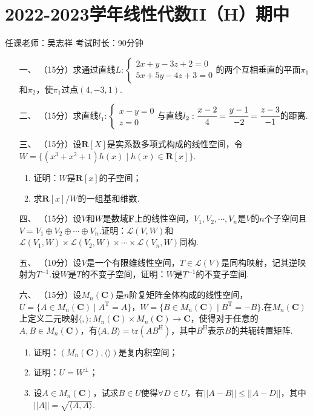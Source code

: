 \section*{2022-2023学年线性代数II（H）期中}

\begin{center}
    任课老师：吴志祥\hspace{4em} 考试时长：90分钟
\end{center}

\begin{enumerate}
	\item[一、]（15分）求通过直线$L:\begin{cases}
        2x+y-3z+2=0 \\ 5x+5y-4z+3=0
    \end{cases}$的两个互相垂直的平面$\pi_1$和$\pi_2$，使$\pi_1$过点$(4,-3,1)$.
	\item[二、]（15分）求直线$l_1:\begin{cases}
        x-y=0 \\ z=0
    \end{cases}$与直线$l_2:\cfrac{x-2}{4}=\cfrac{y-1}{-2}=\cfrac{z-3}{-1}$的距离.
	\item[三、]（15分）设$\mathbf{R}[X]$是实系数多项式构成的线性空间，令$W=\{(x^3+x^2+1)h(x)\mid h(x)\in\mathbf{R}[x]\}$.
	\begin{enumerate}[label=(\arabic*)]
        \item 证明：$W$是$\mathbf{R}[x]$的子空间；
        \item 求$\mathbf{R}[x]/W$的一组基和维数.
    \end{enumerate}
	\item[四、]（15分）设$V$和$W$是数域$\mathbf{F}$上的线性空间，$V_1,V_2,\cdots,V_n$是$V$的$n$个子空间且$V=V_1\oplus V_2\oplus\cdots\oplus V_n$.证明：$\mathcal{L}(V,W)$和$\mathcal{L}(V_1,W)\times\mathcal{L}(V_2,W)\times\cdots\times\mathcal{L}(V_n,W)$同构.
	\item[五、]（10分）设$V$是一个有限维线性空间，$T\in\mathcal{L}(V)$是同构映射，记其逆映射为$T^{-1}$.设$W$是$T$的不变子空间，证明：$W$是$T^{-1}$的不变子空间.
	\item[六、]（15分）设$M_n(\mathbf{C})$是$n$阶复矩阵全体构成的线性空间，$U=\{A\in M_n(\mathbf{C})\mid A^{\mathrm{T}}=A\}，W=\{B\in M_n(\mathbf{C})\mid B^{\mathrm{T}}=-B\}$.在$M_n(\mathbf{C})$上定义二元映射$\langle,\rangle: M_n(\mathbf{C})\times M_n(\mathbf{C})\to\mathbf{C}$，使得对于任意的$A,B\in M_n(\mathbf{C})$，有$\langle A,B\rangle=\mathrm{tr}(AB^{\mathrm{H}})$，其中$B^{\mathrm{H}}$表示$B$的共轭转置矩阵.
	\begin{enumerate}
        \item 证明：$(M_n(\mathbf{C}),\langle\rangle)$是复内积空间；
        \item 证明：$U=W^{\perp}$；
        \item 设$A\in M_n(\mathbf{C})$，试求$B\in U$使得$\forall D\in U$，有$||A-B||\leqslant||A-D||$，其中$||A||=\sqrt{\langle A,A\rangle}$.
    \end{enumerate}


\end{enumerate}
